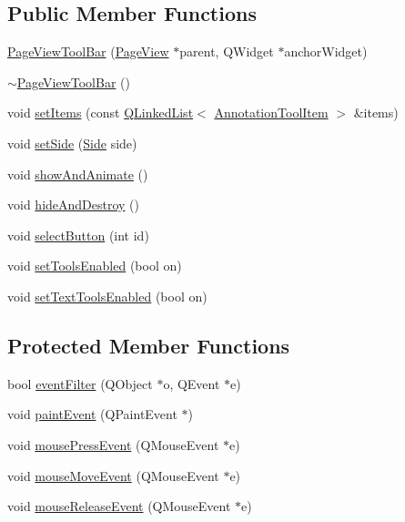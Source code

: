\subsection*{Public Member Functions}
\begin{DoxyCompactItemize}
\item 
\hyperlink{classPageViewToolBar_ade79e6bf2e67d2d2b13ec395d1ef0f11}{Page\+View\+Tool\+Bar} (\hyperlink{classPageView}{Page\+View} $\ast$parent, Q\+Widget $\ast$anchor\+Widget)
\item 
\hyperlink{classPageViewToolBar_a4654d10b39b46944c544c63100f954c8}{$\sim$\+Page\+View\+Tool\+Bar} ()
\item 
void \hyperlink{classPageViewToolBar_a3ba0856b9d3d0e080d674c80a754d902}{set\+Items} (const \hyperlink{classQLinkedList}{Q\+Linked\+List}$<$ \hyperlink{structAnnotationToolItem}{Annotation\+Tool\+Item} $>$ \&items)
\item 
void \hyperlink{classPageViewToolBar_a9f6bb3c8fae4e3b4223c7c6408cfc8d8}{set\+Side} (\hyperlink{classPageViewToolBar_a6410ac0bc9e35fba1314cfd6d7049385}{Side} side)
\item 
void \hyperlink{classPageViewToolBar_a4d401e75a2a30b1fd187697128c926cf}{show\+And\+Animate} ()
\item 
void \hyperlink{classPageViewToolBar_a4dcd221e17f4413bf483c8429219a8b1}{hide\+And\+Destroy} ()
\item 
void \hyperlink{classPageViewToolBar_ae5a4644b057b21f64a2a6945f65cf28a}{select\+Button} (int id)
\item 
void \hyperlink{classPageViewToolBar_a99a0d8cd773f42adfa5420cbd4fa9535}{set\+Tools\+Enabled} (bool on)
\item 
void \hyperlink{classPageViewToolBar_a028996f58918fec0dc4499105a4976c2}{set\+Text\+Tools\+Enabled} (bool on)
\end{DoxyCompactItemize}
\subsection*{Protected Member Functions}
\begin{DoxyCompactItemize}
\item 
bool \hyperlink{classPageViewToolBar_a5097bcc7b6537fbe83f7acb8769d126f}{event\+Filter} (Q\+Object $\ast$o, Q\+Event $\ast$e)
\item 
void \hyperlink{classPageViewToolBar_ab63efdceaac23c8eae3748590978b940}{paint\+Event} (Q\+Paint\+Event $\ast$)
\item 
void \hyperlink{classPageViewToolBar_a49dcf495d1ab21f46f94f0d1f25c3f12}{mouse\+Press\+Event} (Q\+Mouse\+Event $\ast$e)
\item 
void \hyperlink{classPageViewToolBar_a2b2b9102dad9a9c450ce3857af35ad27}{mouse\+Move\+Event} (Q\+Mouse\+Event $\ast$e)
\item 
void \hyperlink{classPageViewToolBar_a1bd8f44461af3e4fe497b8f30f52cf21}{mouse\+Release\+Event} (Q\+Mouse\+Event $\ast$e)
\end{DoxyCompactItemize}
